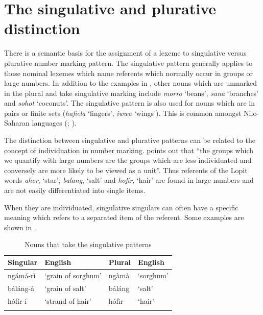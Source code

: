 \documentclass[output=paper]{langsci/langscibook}
\begin{document}
\section{The singulative and plurative distinction}\label{sec:moodie:3}

There is a semantic basis for the assignment of a lexeme to singulative versus plurative number marking pattern. The singulative pattern generally applies to those nominal lexemes which name referents which normally occur in groups or large numbers. In addition to the examples in , other nouns which are unmarked in the plural and take singulative marking include \textit{morro} ‘beans’, \textit{sana} ‘branches’ and \textit{sohot} ‘coconuts’. The singulative pattern is also used for nouns which are in pairs or finite sets (\textit{hafiela} ‘fingers’, \textit{iwwa} ‘wings’). This is common amongst Nilo-Saharan languages (\citealt[216]{Dimmendaal2000}; \citealt[119]{Creisselsetal2008}).

The distinction between singulative and plurative patterns can be related to the concept of individuation in number marking. \citet[217]{Corbett2000} points out that “the groups which we quantify with large numbers are the groups which are less individuated and conversely are more likely to be viewed as a unit”. Thus referents of the Lopit words \textit{aher}, ‘star’, \textit{balang}, ‘salt’ and \textit{hofir}, ‘hair’ are found in large numbers and are not easily differentiated into single items.

When they are individuated, singulative singulars can often have a specific meaning which refers to a separated item of the referent.  Some examples are shown in . 

\begin{table}
\begin{tabularx}{\textwidth}{XlXX}
\lsptoprule

\mdseries \textbf{Singular} & \mdseries \textbf{English} & \mdseries \textbf{Plural} & \mdseries \textbf{English}\\ \midrule
 ngámá-rì & \mdseries ‘grain of sorghum’ &  ngàmà & \mdseries ‘sorghum’\\
 báláng-á & \mdseries ‘grain of salt’ &  báláng & \mdseries ‘salt’\\
 hófír-í & \mdseries ‘strand of hair’ &  hófìr & \mdseries ‘hair’\\
\lspbottomrule
\end{tabularx}
\caption{Nouns that take the singulative patterns}
\label{tab:moodie:6}
\end{table}
\end{document}
